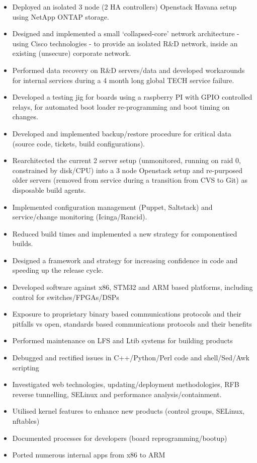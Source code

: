 \begin{itemize}
\item
  Deployed an isolated 3 node (2 HA controllers) Openstack Havana setup
  using NetApp ONTAP storage.
\item
  Designed and implemented a small `collapsed-core' network architecture
  - using Cisco technologies - to provide an isolated R\&D network,
  inside an existing (unsecure) corporate network.
\item
  Performed data recovery on R\&D servers/data and developed workarounds
  for internal services during a 4 month long global TECH service
  failure.
\item
  Developed a testing jig for boards using a raspberry PI with GPIO
  controlled relays, for automated boot loader re-programming and boot
  timing on changes.
\item
  Developed and implemented backup/restore procedure for critical data
  (source code, tickets, build configurations).
\item
  Rearchitected the current 2 server setup (unmonitored, running on raid
  0, constrained by disk/CPU) into a 3 node Openstack setup and
  re-purposed older servers (removed from service during a transition
  from CVS to Git) as disposable build agents.
\item
  Implemented configuration management (Puppet, Saltstack) and
  service/change monitoring (Icinga/Rancid).
\item
  Reduced build times and implemented a new strategy for componentised
  builds.
\item
  Designed a framework and strategy for increasing confidence in code
  and speeding up the release cycle.
\item
  Developed software against x86, STM32 and ARM based platforms,
  including control for switches/FPGAs/DSPs
\item
  Exposure to proprietary binary based communications protocols and
  their pitfalls vs open, standards based communications protocols and
  their benefits
\item
  Performed maintenance on LFS and Ltib systems for building products
\item
  Debugged and rectified issues in C++/Python/Perl code and
  shell/Sed/Awk scripting
\item
  Investigated web technologies, updating/deployment methodologies, RFB
  reverse tunnelling, SELinux and performance analysis/containment.
\item
  Utilised kernel features to enhance new products (control groups,
  SELinux, nftables)
\item
  Documented processes for developers (board reprogramming/bootup)
\item
  Ported numerous internal apps from x86 to ARM
\end{itemize}

